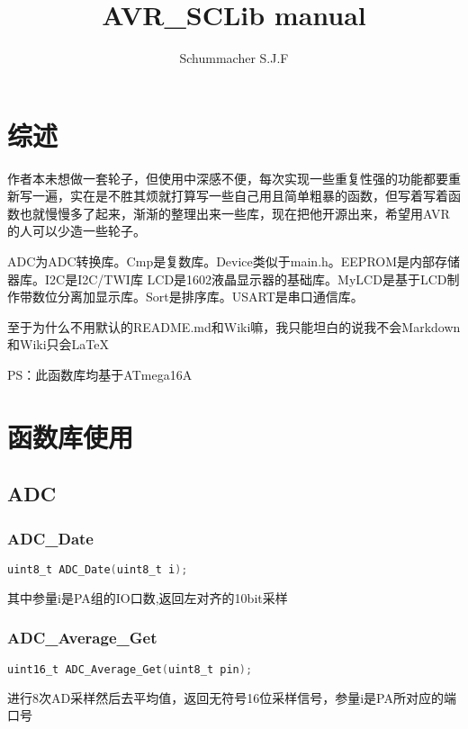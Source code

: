 \documentclass{report}
\title{AVR\_SCLib manual}
\begin{document}
\author{Schummacher S.J.F}
\maketitle
\newpage
\tableofcontents
\newpage

\chapter{综述}
    作者本未想做一套轮子，但使用中深感不便，每次实现一些重复性强的功能都要重新写一遍，实在是不胜其烦就打算写一些自己用且简单粗暴的函数，但写着写着函数也就慢慢多了起来，渐渐的整理出来一些库，现在把他开源出来，希望用AVR的人可以少造一些轮子。\par
    ADC为ADC转换库。Cmp是复数库。Device类似于main.h。EEPROM是内部存储器库。I2C是I2C/TWI库
    LCD是1602液晶显示器的基础库。MyLCD是基于LCD制作带数位分离加显示库。Sort是排序库。USART是串口通信库。\par
    至于为什么不用默认的README.md和Wiki嘛，我只能坦白的说我不会Markdown和Wiki只会\LaTeX\par
    PS：此函数库均基于ATmega16A\par

\chapter{函数库使用}

    \section{ADC}
        \subsection{ADC\_Date}
            \begin{lstlisting}[language=C]
uint8_t ADC_Date(uint8_t i);
            \end{lstlisting}
            其中参量i是PA组的IO口数,返回左对齐的10bit采样

        \subsection{ADC\_Average\_Get}
            \begin{lstlisting}[language=C]
uint16_t ADC_Average_Get(uint8_t pin);
            \end{lstlisting}
            进行8次AD采样然后去平均值，返回无符号16位采样信号，参量i是PA所对应的端口号
\end{document}
